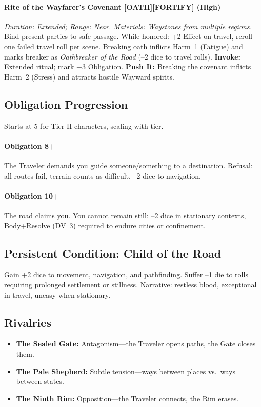 \paragraph{Rite of the Wayfarer's Covenant [OATH][FORTIFY] (High)}  
\emph{Duration: Extended; Range: Near. Materials: Waystones from multiple regions.}  
Bind present parties to safe passage. While honored: +2 Effect on travel, reroll one failed travel roll per scene. Breaking oath inflicts Harm~1 (Fatigue) and marks breaker as \emph{Oathbreaker of the Road} (–2 dice to travel rolls).  
\textbf{Invoke:} Extended ritual; mark +3 Obligation.  
\textbf{Push It:} Breaking the covenant inflicts Harm~2 (Stress) and attracts hostile Wayward spirits.

\subsection*{Obligation Progression}
Starts at 5 for Tier II characters, scaling with tier.

\paragraph{Obligation 8+} The Traveler demands you guide someone/something to a destination. Refusal: all routes fail, terrain counts as difficult, –2 dice to navigation.  

\paragraph{Obligation 10+} The road claims you. You cannot remain still: –2 dice in stationary contexts, Body+Resolve (DV~3) required to endure cities or confinement.

\subsection*{Persistent Condition: Child of the Road}
Gain +2 dice to movement, navigation, and pathfinding. Suffer –1 die to rolls requiring prolonged settlement or stillness. Narrative: restless blood, exceptional in travel, uneasy when stationary.

\subsection*{Rivalries}
\begin{itemize}
\item \textbf{The Sealed Gate:} Antagonism---the Traveler opens paths, the Gate closes them.  
\item \textbf{The Pale Shepherd:} Subtle tension---ways between places vs.\ ways between states.  
\item \textbf{The Ninth Rim:} Opposition---the Traveler connects, the Rim erases.  
\end{itemize}

